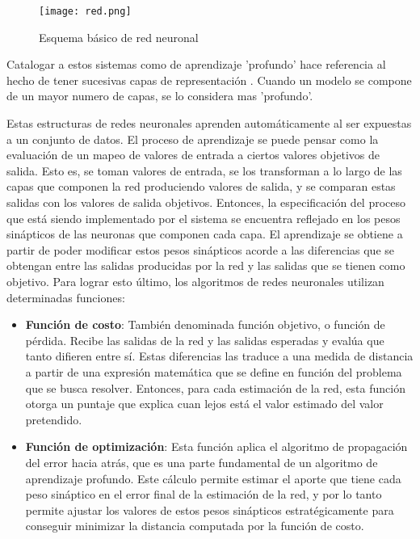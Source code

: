 \begin{figure}[H]
  \centering{}
  \texttt{[image: red.png]}
  \caption{Esquema básico de red neuronal}
  \label{fig:red}
\end{figure}

Catalogar a estos sistemas como de aprendizaje 'profundo' hace referencia al hecho de tener sucesivas capas de representación \cite{franchute}. Cuando un modelo se compone de un mayor numero de capas, se lo considera mas 'profundo'. 

Estas estructuras de redes neuronales aprenden automáticamente al ser expuestas a un conjunto de datos. El proceso de aprendizaje se puede pensar como la evaluación de un mapeo de valores de entrada a ciertos valores objetivos de salida. Esto es, se toman valores de entrada, se los transforman a lo largo de las capas que componen la red produciendo valores de salida, y se comparan estas salidas con los valores de salida objetivos. Entonces, la especificación del proceso que está siendo implementado por el sistema se encuentra reflejado en los pesos sinápticos de las neuronas que componen cada capa. El aprendizaje se obtiene a partir de poder modificar estos pesos sinápticos acorde a las diferencias que se obtengan entre las salidas producidas por la red y las salidas que se tienen como objetivo. Para lograr esto último, los algoritmos de redes neuronales utilizan determinadas funciones: 

\begin{itemize}
\item\textbf{Función de costo}: También denominada función objetivo, o función de pérdida. Recibe las salidas de la red y las salidas esperadas y evalúa que tanto difieren entre sí. Estas diferencias las traduce a una medida de distancia a partir de una expresión matemática que se define en función del problema que se busca resolver. Entonces, para cada estimación de la red, esta función otorga un puntaje que explica cuan lejos está el valor estimado del valor pretendido.  

\item\textbf{Función de optimización}: Esta función aplica el algoritmo de propagación del error hacia atrás, que es una parte fundamental de un algoritmo de aprendizaje profundo. Este cálculo permite estimar el aporte que tiene cada peso sináptico en el error final de la estimación de la red, y por lo tanto permite ajustar los valores de estos pesos sinápticos estratégicamente para conseguir minimizar la distancia computada por la función de costo. 

\end{itemize} 

